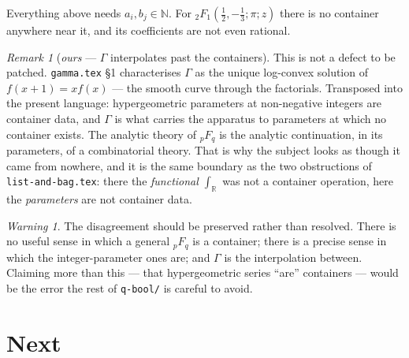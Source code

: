 \documentclass[11pt,a4paper]{article}
\theoremstyle{definition}
\theoremstyle{remark}
\newtheorem{remark}[theorem]{Remark}
\newtheorem{warning}[theorem]{Warning}
\newcommand{\NN}{\mathbb{N}}
\newcommand{\RR}{\mathbb{R}}
\begin{document}
Everything above needs $a_i, b_j \in \NN$. For
${}_2F_1(\tfrac12,-\tfrac13;\pi;z)$ there is no container anywhere near it, and its
coefficients are not even rational.

\begin{remark}[\emph{ours} --- $\Gamma$ interpolates past the containers]\label{rem:gamma-past}
This is not a defect to be patched. \texttt{gamma.tex} \S1 characterises $\Gamma$ as
the unique log-convex solution of $f(x+1) = xf(x)$ --- the smooth curve through the
factorials. Transposed into the present language: hypergeometric parameters at
non-negative integers are container data, and $\Gamma$ is what carries the apparatus
to parameters at which no container exists. The analytic theory of ${}_pF_q$ is the
analytic continuation, in its parameters, of a combinatorial theory. That is why the
subject looks as though it came from nowhere, and it is the same boundary as the two
obstructions of \texttt{list-and-bag.tex}: there the \emph{functional} $\int_\RR$ was
not a container operation, here the \emph{parameters} are not container data.
\end{remark}

\begin{warning}\label{warn:preserve}
The disagreement should be preserved rather than resolved. There is no useful sense in
which a general ${}_pF_q$ is a container; there is a precise sense in which the
integer-parameter ones are; and $\Gamma$ is the interpolation between. Claiming more
than this --- that hypergeometric series ``are'' containers --- would be the error the
rest of \texttt{q-bool/} is careful to avoid.
\end{warning}

\section{Next}
\end{document}
